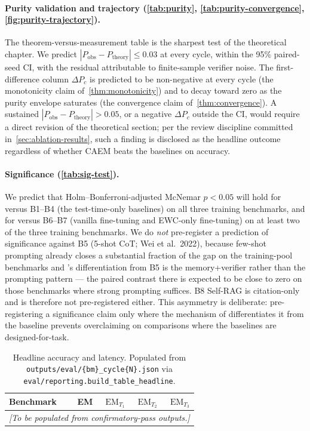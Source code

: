 \paragraph{Purity validation and trajectory
(\cref{tab:purity}, \cref{tab:purity-convergence},
\cref{fig:purity-trajectory}).}
The theorem-versus-measurement table is the sharpest test of the
theoretical chapter. We predict $|P_{\text{obs}} -
P_{\text{theory}}| \le 0.03$ at every cycle, within the 95\%
paired-seed CI, with the residual attributable to finite-sample
verifier noise. The first-difference column $\Delta P_c$ is predicted
to be non-negative at every cycle (the monotonicity
claim of~\cref{thm:monotonicity}) and to decay toward zero as the
purity envelope saturates (the convergence claim
of~\cref{thm:convergence}). A sustained $|P_{\text{obs}} -
P_{\text{theory}}| > 0.05$, or a negative $\Delta P_c$ outside the CI,
would require a direct revision of the theoretical section; per the
review discipline committed in~\cref{sec:ablation-results}, such a
finding is disclosed as the headline outcome regardless of whether
CAEM beats the baselines on accuracy.

\paragraph{Significance (\cref{tab:sig-test}).}
We predict that Holm--Bonferroni-adjusted McNemar $p < 0.05$ will
hold for \caem{} versus B1--B4 (the test-time-only baselines) on all
three training benchmarks, and for \caem{} versus B6--B7 (vanilla
fine-tuning and EWC-only fine-tuning) on at least two of the three
training benchmarks. We do \emph{not} pre-register a prediction of
significance against B5 (5-shot CoT; Wei et al.\ 2022), because
few-shot prompting already closes a substantial fraction of the gap
on the training-pool benchmarks and \caem{}'s differentiation from
B5 is the memory+verifier rather than the prompting pattern --- the
paired contrast there is expected to be close to zero on those
benchmarks where strong prompting suffices. B8 Self-RAG is
citation-only and is therefore not pre-registered either. This
asymmetry is deliberate: pre-registering a significance claim only
where the mechanism of \caem{} differentiates it from the baseline
prevents overclaiming on comparisons where the baselines are
designed-for-task.

\begin{table}[t]
\centering
\caption{Headline accuracy and latency. Populated from
\texttt{outputs/eval/\{bm\}\_cycle\{N\}.json} via
\texttt{eval/reporting.build\_table\_headline}.}
\label{tab:headline}
\begin{tabular}{lrrrr}
\toprule
Benchmark & EM & $\mathrm{EM}_{T_1}$ & $\mathrm{EM}_{T_2}$ & $\mathrm{EM}_{T_3}$ \\
\midrule
\multicolumn{5}{c}{\emph{[To be populated from confirmatory-pass outputs.]}}\\
\bottomrule
\end{tabular}
\end{table}

